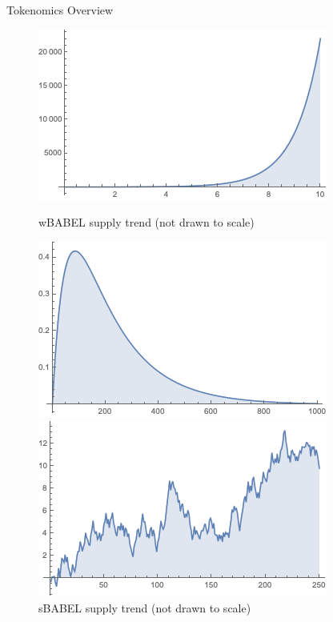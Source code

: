 \documentclass{beamer}
\begin{document}
\begin{frame}{Tokenomics Overview}
\begin{figure}
        \centering
        \begin{minipage}{.32\textwidth}
            \centering
            \includegraphics[width=\linewidth]{images/Fig1.png}
            \caption{wBABEL supply trend (not drawn to scale)}
        \end{minipage}%
        \hfill
        \begin{minipage}{.32\textwidth}
            \centering
            \includegraphics[width=\linewidth]{images/Fig2.png}
            \caption{sBABEL supply trend (not drawn to scale)}
        \end{minipage}
        \hfill
        \begin{minipage}{.32\textwidth}
            \centering
            \includegraphics[width=\linewidth]{images/Fig3.png}

\end{minipage}
\end{figure}
\end{frame}
\end{document}
